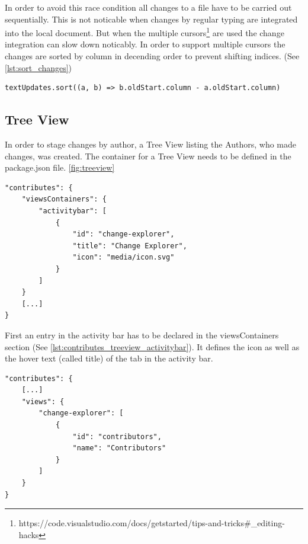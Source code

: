 In order to avoid this race condition all changes to a file have to be carried out sequentially. This is not noticable when changes by regular typing are integrated into the local document. But when the multiple cursors\footnote{https://code.visualstudio.com/docs/getstarted/tips-and-tricks\#\_editing-hacks} are used the change integration can slow down noticably. In order to support multiple cursors the changes are sorted by column in decending order to prevent shifting indices. (See \autoref{lst:sort_changes})
\begin{lstlisting}[label={lst:sort_changes}, caption=Sorting Changes by Column to Prevent Index Shifting]
textUpdates.sort((a, b) => b.oldStart.column - a.oldStart.column)
\end{lstlisting}

\subsection{Tree View}

In order to stage changes by author, a Tree View listing the Authors, who made changes, was created.
The container for a Tree View needs to be defined in the package.json file. \autoref{fig:treeview}

\begin{minipage}{\linewidth}
\begin{lstlisting}[label={lst:contributes_treeview_activitybar}, caption=Tree View Activitybar]
"contributes": {
    "viewsContainers": {
        "activitybar": [
            {
                "id": "change-explorer",
                "title": "Change Explorer",
                "icon": "media/icon.svg"
            }
        ]
    }
    [...]
}
\end{lstlisting}
\end{minipage}

First an entry in the activity bar has to be declared in the viewsContainers section (See \autoref{lst:contributes_treeview_activitybar}). It defines the icon as well as the hover text (called title) of the tab in the activity bar.

\begin{lstlisting}[label={lst:contributes_treeview_view}, caption=Tree View Pannel Definition]
"contributes": {
    [...]
    "views": {
        "change-explorer": [
            {
                "id": "contributors",
                "name": "Contributors"
            }
        ]
    }
}
\end{lstlisting}

